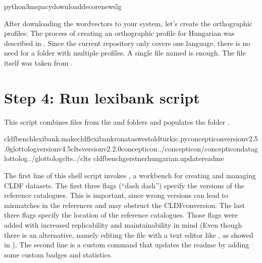 \documentclass[letterpaper,10pt,english]{sphinxmanual}
\begin{document}
{{{{\begin{sphinxVerbatim}[commandchars=\\\{\}]
python3\PYGZhy{}mspacydownloadde\PYGZus{}core\PYGZus{}news\PYGZus{}lg
\end{sphinxVerbatim}

\sphinxAtStartPar
After downloading the word\sphinxhyphen{}vectors to your system, let’s create the
orthographic profiles: The process of creating an orthographic profile for
Hungarian was described in 
. Since the current repository only covers one language, there is no
need for a folder  with multiple profiles. A single file named
 is enough. The file itself was taken from
.


\section{Step 4: Run lexibank script}
\label{\detokenize{mkcldf:step-4-run-lexibank-script}}
\sphinxAtStartPar
This script combines files from the  and  folders
and populates the folder .

\begin{sphinxVerbatim}[commandchars=\\\{\}]
cldfbenchlexibank.makecldflexibank\PYGZus{}ronataswestoldturkic.py\PYGZhy{}\PYGZhy{}concepticon\PYGZhy{}versionv2.5.0\PYGZhy{}\PYGZhy{}glottolog\PYGZhy{}versionv4.5\PYGZhy{}\PYGZhy{}clts\PYGZhy{}versionv2.2.0\PYGZhy{}\PYGZhy{}concepticon../concepticon/concepticon\PYGZhy{}data\PYGZhy{}\PYGZhy{}glottolog../glottolog\PYGZhy{}\PYGZhy{}clts../clts
cldfbenchgerstnerhungarian.update\PYGZus{}readme
\end{sphinxVerbatim}

\sphinxAtStartPar
The first line of this shell script invokes ,
a workbench for creating and managing CLDF datasets. The first three
flags (“dash dash”) specify the versions of the reference catalogues. This is
important,
since wrong versions can lead to mismatches in the references and may
obstruct the CLDF\sphinxhyphen{}conversion.
The last three flags specify the location of the reference
catalogues. Those flags were added with increased replicability and
maintainability in mind (Even though there is an alternative, namely editing
the  file with a text editor like , as showed in
).
The second line is a custom command that updates the readme by adding some
custom badges and statistics.

}}}}
\end{document}
